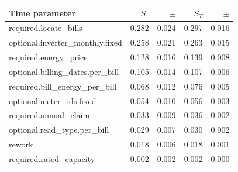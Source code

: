 \begin{tabular}{lrrrr}
\hline
Time parameter & $S_1$ & $\pm$ & $S_T$ & $\pm$ \\
\hline
required.locate\_bills & 0.282 & 0.024 & 0.297 & 0.016 \\
optional.inverter\_monthly.fixed & 0.258 & 0.021 & 0.263 & 0.015 \\
required.energy\_price & 0.128 & 0.016 & 0.139 & 0.008 \\
optional.billing\_dates.per\_bill & 0.105 & 0.014 & 0.107 & 0.006 \\
required.bill\_energy\_per\_bill & 0.068 & 0.012 & 0.076 & 0.005 \\
optional.meter\_ids.fixed & 0.054 & 0.010 & 0.056 & 0.003 \\
required.annual\_claim & 0.033 & 0.009 & 0.036 & 0.002 \\
optional.read\_type.per\_bill & 0.029 & 0.007 & 0.030 & 0.002 \\
rework & 0.018 & 0.006 & 0.018 & 0.001 \\
required.rated\_capacity & 0.002 & 0.002 & 0.002 & 0.000 \\
\hline
\end{tabular}
